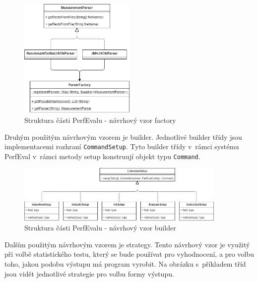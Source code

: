 \begin{figure}[!ht]
    \centering
    \includegraphics[width=0.5\textwidth]{../img/architektura-factory.png}
    \caption{Struktura části PerfEvalu - návrhový vzor factory}
\end{figure}


Druhým použitým návrhovým vzorem je builder. Jednotlivé builder třídy
jsou implementacemi rozhraní \lstinline{CommandSetup}. Tyto builder třídy v~rámci
systému PerfEval v~rámci metody setup konstruují objekt typu \lstinline{Command}.

\begin{figure}[!ht]
    \centering
    \includegraphics[width=0.9\textwidth]{../img/architektura-builder.png}
    \caption{Struktura části PerfEvalu - návrhový vzor builder}
\end{figure}

Dalším použitým návrhovým vzorem je strategy. Tento návrhový vzor je využitý při
volbě statistického testu, který se bude používat pro vyhodnocení, a pro volbu toho,
jakou podobu výstupu má program vyrobit. Na obrázku s~příkladem tříd jsou vidět
jednotlivé strategie pro volbu formy výstupu.

